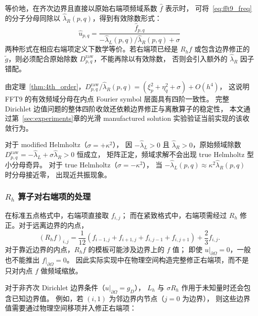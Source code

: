 等价地，在齐次边界且直接以原始右端项频域系数 $\hat{f}$ 表示时，
可将~\eqref{eq:fft9_freq}的分子分母同除以 $\hat{\lambda}_R(p,q)$，得到有效除数形式：
\begin{equation}
  \hat{u}_{p,q} = \frac{\hat{f}_{p,q}}{-\hat{\lambda}_L(p,q)/\hat{\lambda}_R(p,q) + \sigma}
  \label{eq:fft9_freq_eff}
\end{equation}
两种形式在相应右端项定义下数学等价。若右端项已经是 $R_h f$ 或包含边界修正的
$\tilde{g}$，则必须配合原始除数 $D_{p,q}^{\mathrm{raw}}$，不能再除以有效除数，
否则会引入额外的 $\hat{\lambda}_R$ 因子错配。

由定理~\ref{thm:4th_order}，$D_{p,q}^{\mathrm{raw}}/\hat{\lambda}_R(p,q) = (\xi_p^2+\eta_q^2+\sigma) + O(h^4)$，
这说明 FFT9 的有效频域分母在内点 Fourier symbol 层面具有四阶一致性。
完整 Dirichlet 边值问题的整体四阶收敛还依赖边界修正与离散算子的稳定性，
本文通过第~\ref{sec:experiments}章的光滑 manufactured solution 实验验证当前实现的该收敛行为。

\begin{remark}
  对于 modified Helmholtz（$\sigma=+\kappa^2$），
  因 $-\hat{\lambda}_L > 0$ 且 $\hat{\lambda}_R > 0$，原始频域除数 $D_{p,q}^{\mathrm{raw}} = -\hat{\lambda}_L+\sigma\hat{\lambda}_R > 0$ 恒成立，
  矩阵正定，频域求解不会出现 true Helmholtz 型小分母奇异。
  对于 true Helmholtz（$\sigma=-\kappa^2$），
  当 $-\hat{\lambda}_L(p,q) \approx \kappa^2\hat{\lambda}_R(p,q)$ 时分母接近零，
  出现近共振现象。
\end{remark}

\subsubsection{$R_h$ 算子对右端项的处理}

在标准五点格式中，右端项直接取 $f_{i,j}$；
而在紧致格式中，右端项需经过 $R_h$ 修正。对于远离边界的内点，
\begin{equation}
  (R_h f)_{i,j} =
  \frac{1}{12}(f_{i-1,j}+f_{i+1,j}+f_{i,j-1}+f_{i,j+1}) + \frac{2}{3}f_{i,j}.
\end{equation}
对于靠近边界的内点，$R_h f$ 的模板可能涉及边界上的 $f$ 值；
即使 $u|_{\partial\Omega}=0$，一般也不能推出 $f|_{\partial\Omega}=0$。
因此实际实现中在物理空间构造完整修正右端项，而不是只对内点 $f$ 做频域缩放。

对于非齐次 Dirichlet 边界条件（$u|_{\partial\Omega} = g_D$），
$L_h$ 与 $\sigma R_h$ 作用于未知量时还会包含已知边界值。
例如，若 $(i,1)$ 为邻边界内节点（$j=0$ 为边界），
则这些边界值需要通过物理空间移项并入修正右端项：

